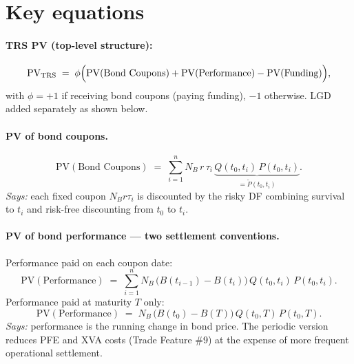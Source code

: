\documentclass[11pt,a4paper]{article}
\begin{document}
\section{Key equations}

\paragraph{TRS PV (top-level structure):}
\begin{equation}\label{eq:btrs-top}
  \mathrm{PV}_{\mathrm{TRS}} \;=\; \phi \Bigl( \mathrm{PV}(\text{Bond Coupons}) + \mathrm{PV}(\text{Performance}) - \mathrm{PV}(\text{Funding}) \Bigr),
\end{equation}
with $\phi = +1$ if receiving bond coupons (paying funding), $-1$
otherwise. LGD added separately as shown below.

\paragraph{PV of bond coupons.}
\begin{equation}\label{eq:btrs-coupons}
  \mathrm{PV}(\text{Bond Coupons}) \;=\; \sum_{i=1}^{n} N_B\, r\, \tau_i\, \underbrace{Q(t_0, t_i)\, P(t_0, t_i)}_{= \widetilde P(t_0, t_i)}.
\end{equation}
\textit{Says:} each fixed coupon $N_B r \tau_i$ is discounted by the
risky DF combining survival to $t_i$ and risk-free discounting from
$t_0$ to $t_i$.

\paragraph{PV of bond performance --- two settlement conventions.}
Performance paid on each coupon date:
\begin{equation}\label{eq:btrs-perf-periodic}
  \mathrm{PV}(\text{Performance}) \;=\; \sum_{i=1}^{n} N_B\, \bigl( B(t_{i-1}) - B(t_i) \bigr)\, Q(t_0, t_i)\, P(t_0, t_i).
\end{equation}
Performance paid at maturity $T$ only:
\begin{equation}\label{eq:btrs-perf-bullet}
  \mathrm{PV}(\text{Performance}) \;=\; N_B\, \bigl( B(t_0) - B(T) \bigr)\, Q(t_0, T)\, P(t_0, T).
\end{equation}
\textit{Says:} performance is the running change in bond price. The
periodic version reduces PFE and XVA costs (Trade Feature \#9) at the
expense of more frequent operational settlement.
\end{document}
